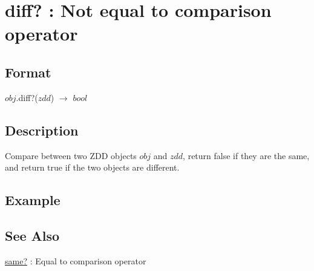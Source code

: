 
\section{diff? : Not equal to comparison operator\label{sect:diff?}}
\subsection*{Format}
$obj$.diff?($zdd$) $\rightarrow$ $bool$

\subsection*{Description}
Compare between two ZDD objects $obj$ and $zdd$, return false if they are the same, and return true if the two objects are different. 

\subsection*{Example}


\subsection*{See Also}
\hyperref[sect:same?]{same?} : Equal to comparison operator